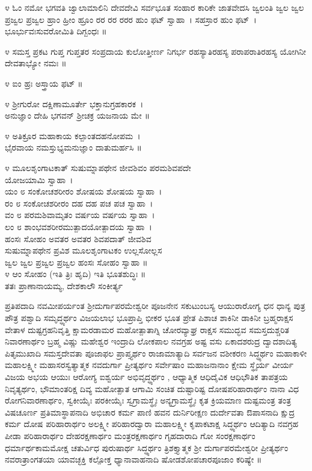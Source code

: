 ೪ ಓಂ ನಮೋ ಭಗವತಿ ಜ್ವಾಲಾಮಾಲಿನಿ ದೇವದೇವಿ ಸರ್ವಭೂತ ಸಂಹಾರ ಕಾರಿಕೇ ಜಾತವೇದಸಿ ಜ್ವಲಂತಿ ಜ್ವಲ ಜ್ವಲ ಪ್ರಜ್ವಲ ಪ್ರಜ್ವಲ ಹ್ರಾಂ ಹ್ರೀಂ ಹ್ರೂಂ ರರ ರರ ರರರ ಹುಂ ಫಟ್ ಸ್ವಾಹಾ~। ಸಹಸ್ರಾರ ಹುಂ ಫಟ್~।\\ ಭೂರ್ಭುವಃಸುವರೋಮಿತಿ ದಿಗ್ಬಂಧಃ ॥

೪ ಸಮಸ್ತ ಪ್ರಕಟ ಗುಪ್ತ ಗುಪ್ತತರ ಸಂಪ್ರದಾಯ ಕುಲೋತ್ತೀರ್ಣ ನಿಗರ್ಭ ರಹಸ್ಯಾ\-ತಿರಹಸ್ಯ ಪರಾಪರಾತಿರಹಸ್ಯ ಯೋಗಿನೀ ದೇವತಾಭ್ಯೋ ನಮಃ ॥

೪ ಐಂ ಹ್ರಃ ಅಸ್ತ್ರಾಯ ಫಟ್ ॥

೪ ಶ್ರೀಗುರೋ ದಕ್ಷಿಣಾಮೂರ್ತೇ ಭಕ್ತಾನುಗ್ರಹಕಾರಕ~।\\
ಅನುಜ್ಞಾಂ ದೇಹಿ ಭಗವನ್ ಶ್ರೀಚಕ್ರ ಯಜನಾಯ ಮೇ ॥

೪ ಅತಿಕ್ರೂರ ಮಹಾಕಾಯ ಕಲ್ಪಾಂತದಹನೋಪಮ~।\\
ಭೈರವಾಯ ನಮಸ್ತುಭ್ಯಮನುಜ್ಞಾಂ ದಾತುಮರ್ಹಸಿ ॥

೪ ಮೂಲಶೃಂಗಾಟಕಾತ್ ಸುಷುಮ್ನಾಪಥೇನ ಜೀವಶಿವಂ ಪರಮಶಿವಪದೇ \\ಯೋಜಯಾಮಿ ಸ್ವಾಹಾ~।\\
ಯಂ ೮ ಸಂಕೋಚಶರೀರಂ ಶೋಷಯ ಶೋಷಯ ಸ್ವಾಹಾ~।\\
ರಂ ೮ ಸಂಕೋಚಶರೀರಂ ದಹ ದಹ ಪಚ ಪಚ ಸ್ವಾಹಾ~।\\
ವಂ ೮ ಪರಮಶಿವಾಮೃತಂ ವರ್ಷಯ ವರ್ಷಯ ಸ್ವಾಹಾ~।\\
ಲಂ ೮ ಶಾಂಭವಶರೀರಮುತ್ಪಾದಯೋತ್ಪಾದಯ ಸ್ವಾಹಾ~।\\
ಹಂಸಃ ಸೋಹಂ ಅವತರ ಅವತರ ಶಿವಪದಾತ್ ಜೀವಶಿವ\\ ಸುಷುಮ್ನಾಪಥೇನ ಪ್ರವಿಶ ಮೂಲಶೃಂಗಾಟಕಂ ಉಲ್ಲಸೋಲ್ಲಸ\\ ಜ್ವಲ ಜ್ವಲ ಪ್ರಜ್ವಲ ಪ್ರಜ್ವಲ ಹಂಸಃ ಸೋಹಂ ಸ್ವಾಹಾ ॥\\
೪ ಆಂ ಸೋಹಂ (ಇತಿ ತ್ರಿಃ ಹೃದಿ) ಇತಿ ಭೂತಶುದ್ಧಿಃ ॥\\
ತತಃ ಪ್ರಾಣಾನಾಯಮ್ಯ, ದೇಶಕಾಲೌ ಸಂಕೀರ್ತ್ಯ 

ಪ್ರತಿಪದಾದಿ ನವಮೀಪರ್ಯಂತ ಶ್ರೀದುರ್ಗಾಪರಮೇಶ್ವರೀ ಪೂಜನೇನ ಸಕುಟುಂಬಸ್ಯ ಆಯುರಾರೋಗ್ಯ ಧನ ಧಾನ್ಯ ಪುತ್ರ ಪೌತ್ರ ಪಶ್ವಾದಿ ಸಮೃದ್ಧ್ಯರ್ಥಂ ವಿಜಯಲಾಭ ಭೂಪ್ರಾಪ್ತಿ ಭೀಕರ ಭೂತ ಪ್ರೇತ ಪಿಶಾಚ ಶಾಕಿನೀ ಡಾಕಿನೀ ಬ್ರಹ್ಮರಾಕ್ಷಸ ವೇತಾಳ ದುಷ್ಟಗ್ರಹನಿವೃತ್ತಿ ಕ್ಷಾಮರಡಾಮರ ಮಹೋತ್ಪಾತಾಗ್ನಿ ಚೋರವ್ಯಾಘ್ರ ರಾಕ್ಷಸ ಸಮುದ್ಭವ ಸಮಸ್ತದುಶ್ಚರಿತ ನಿವಾರಣಾರ್ಥಂ ಬ್ರಹ್ಮ ವಿಷ್ಣು ಮಹೇಶ್ವರ ಇಂದ್ರಾದಿ ಲೋಕಪಾಲ ನವಗ್ರಹ ಅಷ್ಟ ವಸು ಏಕಾದಶರುದ್ರ ದ್ವಾದಶಾದಿತ್ಯ ಪಿತೃಮುಖಾದಿ ಸಮಸ್ತದೇವತಾ ಪೂಜಾಫಲ ಪ್ರಾಪ್ತ್ಯರ್ಥಂ ರಾಜಾಮಾತ್ಯಾದಿ ಸರ್ವಜನ ವಶೀಕರಣ ಸಿದ್ಧ್ಯರ್ಥಂ ಮಹಾಕಾಳೀ ಮಹಾಲಕ್ಷ್ಮೀ ಮಹಾಸರಸ್ವತ್ಯಾತ್ಮಕ ನವದುರ್ಗಾ  ಪ್ರೀತ್ಯರ್ಥಂ ಸರ್ವೇಷಾಂ ಮಹಾಜನಾನಾಂ ಕ್ಷೇಮ ಸ್ಥೈರ್ಯ ವೀರ್ಯ ವಿಜಯ ಅಭಯ ಆಯುಃ ಆರೋಗ್ಯ ಐಶ್ವರ್ಯ ಅಭಿವೃದ್ಧ್ಯರ್ಥಂ , ಆಧ್ಯಾತ್ಮಿಕ ಆಧಿದೈವಿಕ ಆಧಿಭೌತಿಕ ತಾಪತ್ರಯ ನಿವೃತ್ಯರ್ಥಂ, ಭೌಮಾಂತರಿಕ್ಷ ದಿವ್ಯ ಮಹೋತ್ಪಾತ ಆಗಾಮಿ ಸಂಚಿತ ದುಷ್ಟಾರಿಷ್ಟ ದೋಷಪರಿಹಾರಾರ್ಥಂ ನಾನಾ ವಿಧ ರೋಗನಿವಾರಣಾರ್ಥಂ, ಸ್ವಕೀಯೈಃ ಪರಕೀಯೈಃ ಸ್ವಗ್ರಾಮಸ್ಥೈಃ  ಅನ್ಯಗ್ರಾಮಸ್ಥೈಃ ಕೃತ ಕ್ರಿಯಮಾಣ ದುಷ್ಟಮಂತ್ರ ತಂತ್ರ ವಿಷಚೂರ್ಣ ಪ್ರತಿಮಾಸ್ಥಾಪನಾದಿ ಅಭಿಚಾರ ಕರ್ಮ ಪಾಣಿ ಹವನ ದುರ್ನಿರೀಕ್ಷಣ ದುರ್ದೇವತಾ ಔಪಾಸನಾದಿ ಕ್ಷುದ್ರ ಕರ್ಮ ದೋಷ ಪರಿಹಾರಾರ್ಥಂ ಅಲಕ್ಷ್ಮೀ ಪರಿಹಾರದ್ವಾರಾ ಮಹಾಲಕ್ಷ್ಮೀ ಕೃಪಾಕಟಾಕ್ಷ ಸಿದ್ಧ್ಯರ್ಥಂ ಆದಿತ್ಯಾದಿ ನವಗ್ರಹ ಪೀಡಾ ಪರಿಹಾರಾರ್ಥಂ ದೇಹರಕ್ಷಣಾರ್ಥಂ ಮಂತ್ರರಕ್ಷಣಾರ್ಥಂ ಗೃಹದಾರಾದಿ ಗೋ ಸಂರಕ್ಷಣಾರ್ಥಂ ಧರ್ಮಾರ್ಥಕಾಮಮೋಕ್ಷ ಚತುರ್ವಿಧ ಪುರುಷಾರ್ಥ ಸಿದ್ಧ್ಯರ್ಥಂ ತ್ರಿಶಕ್ತ್ಯಾತ್ಮಕ ಶ್ರೀ ದುರ್ಗಾಪರಮೇಶ್ವರೀ ಪ್ರೀತ್ಯರ್ಥಂ ನವರಾತ್ರಾಂಗತಯಾ ಯಾವಚ್ಛಕ್ತಿ ಕಲ್ಪೋಕ್ತ ಧ್ಯಾನಾವಾಹನಾದಿ ಷೋಡಶೋಪಚಾರಪೂಜಾಂ ಕರಿಷ್ಯೇ ॥

